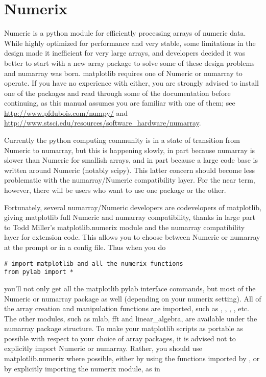 \documentclass[twoside]{book}
\begin{document}
\section{Numerix}
\label{sec:numerix}

Numeric is a python module for efficiently processing arrays of
numeric data.  While highly optimized for performance and very stable,
some limitations in the design made it inefficient for very large
arrays, and developers decided it was better to start with a new array
package to solve some of these design problems and numarray was born.
matplotlib requires one of Numeric or numarray to operate.  If you
have no experience with either, you are strongly advised to install
one of the packages and read through some of the documentation before
continuing, as this manual assumes you are familiar with one of them;
see \url{http://www.pfdubois.com/numpy/} and
\url{http://www.stsci.edu/resources/software_hardware/numarray}.

Currently the python computing community is in a state of transition
from Numeric to numarray, but this is happening slowly, in part
because numarray is slower than Numeric for smallish arrays, and in
part because a large code base is written around Numeric (notably
scipy).  This latter concern should become less problematic with the
numarray/Numeric compatibility layer.  For the near term, however,
there will be users who want to use one package or the other.

Fortunately, several numarray/Numeric developers are codevelopers of
matplotlib, giving matplotlib full Numeric and numarray compatibility,
thanks in large part to Todd Miller's matplotlib.numerix module and
the numarray compatibility layer for extension code.  This allows you
to choose between Numeric or numarray at the prompt or in a config
file.  Thus when you do

\begin{lstlisting}
# import matplotlib and all the numerix functions
from pylab import *
\end{lstlisting}

\noindent you'll not only get all the matplotlib pylab interface
commands, but most of the Numeric or numarray package as well
(depending on your numerix setting).  All of the array creation and
manipulation functions are imported, such as ,
, , , etc.  The other modules,
such as mlab, fft and linear\_algebra, are available under the numarray
package structure.  To make your matplotlib scripts as portable as
possible with respect to your choice of array packages, it is advised
not to explicitly import Numeric or numarray.  Rather, you should use
matplotlib.numerix where possible, either by using the functions
imported by , or by explicitly importing the numerix
module, as in
\end{document}

